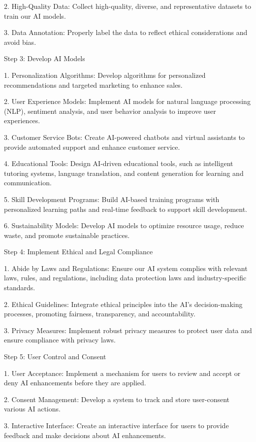 \documentclass[12pt,letterpaper]{article}
\begin{document}
2. High-Quality Data: Collect high-quality, diverse, and representative datasets to train our AI models.

3. Data Annotation: Properly label the data to reflect ethical considerations and avoid bias.

Step 3: Develop AI Models

1. Personalization Algorithms: Develop algorithms for personalized recommendations and targeted marketing to enhance sales.

2. User Experience Models: Implement AI models for natural language processing (NLP), sentiment analysis, and user behavior analysis to improve user experiences.

3. Customer Service Bots: Create AI-powered chatbots and virtual assistants to provide automated support and enhance customer service.

4. Educational Tools: Design AI-driven educational tools, such as intelligent tutoring systems, language translation, and content generation for learning and communication.

5. Skill Development Programs: Build AI-based training programs with personalized learning paths and real-time feedback to support skill development.

6. Sustainability Models: Develop AI models to optimize resource usage, reduce waste, and promote sustainable practices.

Step 4: Implement Ethical and Legal Compliance

1. Abide by Laws and Regulations: Ensure our AI system complies with relevant laws, rules, and regulations, including data protection laws and industry-specific standards.

2. Ethical Guidelines: Integrate ethical principles into the AI's decision-making processes, promoting fairness, transparency, and accountability.

3. Privacy Measures: Implement robust privacy measures to protect user data and ensure compliance with privacy laws.

 Step 5: User Control and Consent

1. User Acceptance: Implement a mechanism for users to review and accept or deny AI enhancements before they are applied.

2. Consent Management: Develop a system to track and store user-consent various AI actions.

3. Interactive Interface: Create an interactive interface for users to provide feedback and make decisions about AI enhancements.
\end{document}
